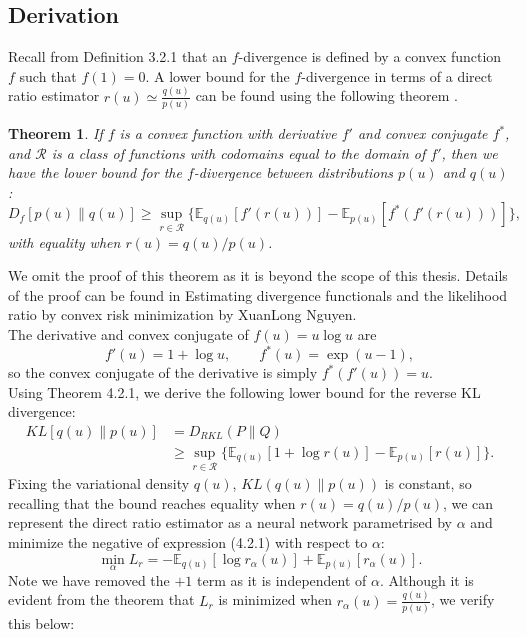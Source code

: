 \documentclass[honours,12pt]{unswthesis}
\newcommand{\E}{\mathbb{E}}
\newtheorem{theorem}{Theorem}[section]
\numberwithin{equation}{section}
\theoremstyle{definition}
\begin{document}
\subsection{Derivation}
Recall from Definition 3.2.1 that an $f$-divergence is defined by a convex function $f$ such that $f(1)=0$. A lower bound for the $f$-divergence in terms of a direct ratio estimator $r(u)\simeq \frac{q(u)}{p(u)}$ can be found using the following theorem \citep{nguyen}.
\begin{theorem}
If $f$ is a convex function with derivative $f'$ and convex conjugate $f^*$, and $\mathcal{R}$ is a class of functions with codomains equal to the domain of $f'$, then we have the lower bound for the $f$-divergence between distributions $p(u)$ and $q(u)$:
\[D_f [p(u)\|q(u)]\geq \sup_{r\in \mathcal{R}} \{\mathbb{E}_{q(u)}[f'(r(u))]-\mathbb{E}_{p(u)}[f^*(f'(r(u)))]\},\]
with equality when $r(u)=q(u)/p(u)$.
\end{theorem}
We omit the proof of this theorem as it is beyond the scope of this thesis. Details of the proof can be found in Estimating divergence functionals and the likelihood ratio by convex risk minimization by XuanLong Nguyen.\\
The derivative and convex conjugate of $f(u)=u\log u$ are
\[f'(u)=1+\log u, \qquad f^*(u)=\exp(u-1),\]
so the convex conjugate of the derivative is simply $f^*(f'(u))=u$.\\
Using Theorem 4.2.1, we derive the following lower bound for the reverse KL divergence:
\begin{align}
KL[q(u)\|p(u)]&=D_{RKL}(P\|Q)\nonumber\\
&\geq \sup_{r\in \mathcal{R}}\{\mathbb{E}_{q(u)}[1+\log r(u)]-\mathbb{E}_{p(u)}[r(u)]\}.
\end{align}
Fixing the variational density $q(u)$, $KL(q(u)\|p(u))$ is constant, so recalling that the bound reaches equality when $r(u)=q(u)/p(u)$, we can represent the direct ratio estimator as a neural network parametrised by $\alpha$ and minimize the negative of expression (4.2.1) with respect to $\alpha$:
\begin{equation}
\min_\alpha L_r=-\E_{q(u)}[\log r_\alpha(u)]+\E_{p(u)}[r_\alpha(u)].
\end{equation}
Note we have removed the $+1$ term as it is independent of $\alpha$. Although it is evident from the theorem that $L_r$ is minimized when $r_\alpha(u)=\frac{q(u)}{p(u)}$, we verify this below:
\end{document}
